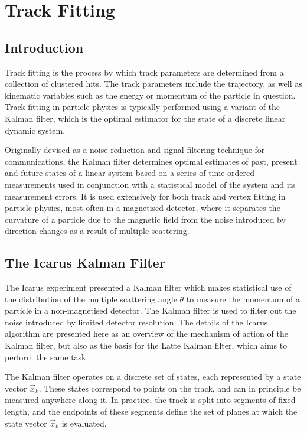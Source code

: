 \chapter{Track Fitting}\label{chapter:KalmanFilter}

\section{Introduction}
Track fitting is the process by which track parameters are determined from a collection of clustered hits. The track parameters include the trajectory, as well as kinematic variables such as the energy or momentum of the particle in question. Track fitting in particle physics is typically performed using a variant of the Kalman filter, which is the optimal estimator for the state of a discrete linear dynamic system.

Originally devised as a noise-reduction and signal filtering technique for communications, the Kalman filter determines optimal estimates of past, present and future states of a linear system based on a series of time-ordered measurements used in conjunction with a statistical model of the system and its measurement errors. It is used extensively for both track and vertex fitting in particle physics, most often in a magnetised detector, where it separates the curvature of a particle due to the magnetic field from the noise introduced by direction changes as a result of multiple scattering.

\section{The Icarus Kalman Filter}
The Icarus\citep{Amerio2004} experiment presented a Kalman filter\citep{Fruhwirth1987} which makes statistical use of the distribution of the multiple scattering angle $\theta$ to measure the momentum of a particle in a non-magnetised detector\citep{Ankowski2006}. The Kalman filter is used to filter out the noise introduced by limited detector resolution. The details of the Icarus algorithm are presented here as an overview of the mechanism of action of the Kalman filter, but also as the basis for the Latte Kalman filter, which aims to perform the same task.

The Kalman filter operates on a discrete set of states, each represented by a state vector $\vec{x}_k$. These states correspond to points on the track, and can in principle be measured anywhere along it. In practice, the track is split into segments of fixed length, and the endpoints of these segments define the set of planes at which the state vector $\vec{x}_k$ is evaluated. 


